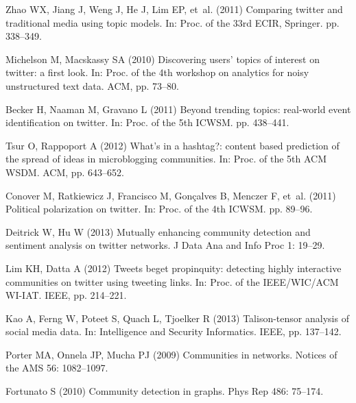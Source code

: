 \documentclass[10pt,letterpaper]{article}
\begin{document}
\begin{thebibliography}{10}
Zhao WX, Jiang J, Weng J, He J, Lim EP, et~al. (2011) Comparing twitter and
  traditional media using topic models.
\newblock In: Proc. of the 33rd ECIR, Springer. pp. 338--349.

Michelson M, Macskassy SA (2010) Discovering users' topics of interest on
  twitter: a first look.
\newblock In: Proc. of the 4th workshop on analytics for noisy unstructured
  text data. ACM, pp. 73--80.

Becker H, Naaman M, Gravano L (2011) Beyond trending topics: real-world event
  identification on twitter.
\newblock In: Proc. of the 5th ICWSM. pp. 438--441.

Tsur O, Rappoport A (2012) What's in a hashtag?: content based prediction of
  the spread of ideas in microblogging communities.
\newblock In: Proc. of the 5th ACM WSDM. ACM, pp. 643--652.

Conover M, Ratkiewicz J, Francisco M, Gon{\c{c}}alves B, Menczer F, et~al.
  (2011) Political polarization on twitter.
\newblock In: Proc. of the 4th ICWSM. pp. 89--96.

Deitrick W, Hu W (2013) Mutually enhancing community detection and sentiment
  analysis on twitter networks.
\newblock J Data Ana and Info Proc 1: 19--29.

Lim KH, Datta A (2012) Tweets beget propinquity: detecting highly interactive
  communities on twitter using tweeting links.
\newblock In: Proc. of the IEEE/WIC/ACM WI-IAT. IEEE, pp. 214--221.

Kao A, Ferng W, Poteet S, Quach L, Tjoelker R (2013) Talison-tensor analysis of
  social media data.
\newblock In: Intelligence and Security Informatics. IEEE, pp. 137--142.

Porter MA, Onnela JP, Mucha PJ (2009) Communities in networks.
\newblock Notices of the AMS 56: 1082--1097.

Fortunato S (2010) Community detection in graphs.
\newblock Phys Rep 486: 75--174.


\end{thebibliography}
\end{document}
